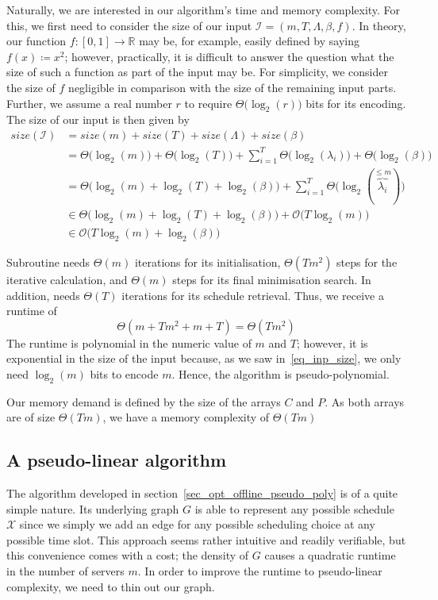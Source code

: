 \documentclass[hidelinks]{article}
\theoremstyle{plain}
\theoremstyle{definition}
\theoremstyle{rem}
\newcommand{\mx}{\mathcal{X}}
\newcommand{\inp}{\mathcal{I}}
\begin{document}
Naturally, we are interested in our algorithm's time and memory complexity. 
For this, we first need to consider the size of our input $\inp=(m,T,\Lambda,\beta,f)$. In theory, our function $f:[0,1]\rightarrow \mathbb{R}$ may be, for example, easily defined by saying $f(x)\coloneqq x^2$; however, practically, it is difficult to answer the question what the size of such a function as part of the input may be. For simplicity, we consider the size of $f$ negligible in comparison with the size of the remaining input parts. Further, we assume a real number $r$ to require $\Theta\bigl(\log_2(r)\bigr)$ bits for its encoding. The size of our input is then given by
\begin{align}
	size(\inp)&=size(m)+size(T)+size(\Lambda)+size(\beta)\nonumber\\
	&=\Theta\bigl(\log_2(m)\bigr)+\Theta\bigl(\log_2(T)\bigr)+\sum\limits_{i=1}^T \Theta\bigl(\log_2(\lambda_i)\bigr)+\Theta\bigl(\log_2(\beta)\bigr)\nonumber\\
	&=\Theta\bigl(\log_2(m)+\log_2(T)+\log_2(\beta)\bigr)+\sum\limits_{i=1}^T \Theta\bigl(\log_2(\overbrace{\lambda_i}^{\le m})\bigr)\nonumber\\
	&\in\Theta\bigl(\log_2(m)+\log_2(T)+\log_2(\beta)\bigr)+\mathcal{O}\bigl(T\log_2(m)\bigr)\nonumber\\
	&\in\mathcal{O}\bigl(T\log_2(m)+\log_2(\beta)\bigr)\label{eq_inp_size}
\end{align}

Subroutine  needs $\Theta(m)$ iterations for its initialisation, $\Theta(Tm^2)$ steps for the iterative calculation, and $\Theta(m)$ steps for its final minimisation search. In addition,  needs $\Theta(T)$ iterations for its schedule retrieval. Thus, we receive a runtime of 
\begin{equation*}
	\Theta(m+Tm^2+m+T)=\Theta(Tm^2)
\end{equation*}
The runtime is polynomial in the numeric value of $m$ and $T$; however, it is exponential in the size of the input because, as we saw in~\eqref{eq_inp_size}, we only need $\log_2(m)$ bits to encode $m$. Hence, the algorithm is pseudo-polynomial.

Our memory demand is defined by the size of the arrays $C$ and $P$. As both arrays are of size $\Theta(Tm)$, we have a memory complexity of $\Theta(Tm)$

\subsection{A pseudo-linear algorithm}\label{sec_opt_offline_pseudo_lin}
The algorithm developed in section~\ref{sec_opt_offline_pseudo_poly} is of a quite simple nature. Its underlying graph $G$ is able to represent any possible schedule $\mx$ since we simply we add an edge for any possible scheduling choice at any possible time slot. This approach seems rather intuitive and readily verifiable, but this convenience comes with a cost; the density of $G$ causes a quadratic runtime in the number of servers $m$. In order to improve the runtime to pseudo-linear complexity, we need to thin out our graph. 
\end{document}
